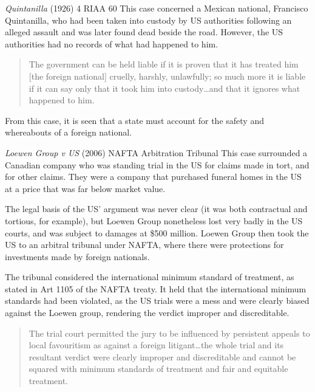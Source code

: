 \begin{casedetails}{\textit{Quintanilla} (1926) 4 RIAA 60}
    \flushleft
    This case concerned a Mexican national, Francisco Quintanilla, who had been taken into custody by US authorities following an alleged assault and was later found dead beside the road. However, the US authorities had no records of what had happened to him.

    \begin{quote}
        The government can be held liable if it is proven that it has treated him [the foreign national] cruelly, harshly, unlawfully; so much more it is liable if it can say only that it took him into custody…and that it ignores what happened to him.
    \end{quote}

    From this case, it is seen that a state must account for the safety and whereabouts of a foreign national.
\end{casedetails}

\begin{casedetails}{\textit{Loewen Group v US} (2006) NAFTA Arbitration Tribunal}
    \flushleft
    This case surrounded a Canadian company who was standing trial in the US for claims made in tort, and for other claims. They were a company that purchased funeral homes in the US at a price that was far below market value.
    
    \vspace{\baselineskip}

    The legal basis of the US' argument was never clear (it was both contractual and tortious, for example), but Loewen Group nonetheless lost very badly in the US courts, and was subject to damages at \$500 million. Loewen Group then took the US to an arbitral tribunal under NAFTA, where there were protections for investments made by foreign nationals.

    \vspace{\baselineskip}

    The tribunal considered the international minimum standard of treatment, as stated in Art 1105 of the NAFTA treaty. It held that the international minimum standards had been violated, as the US trials were a mess and were clearly biased against the Loewen group, rendering the verdict improper and discreditable.
    
    \begin{quote}
        The trial court permitted the jury to be influenced by persistent appeals to local favouritism as against a foreign litigant…the whole trial and its resultant verdict were clearly improper and discreditable and cannot be squared with minimum standards of treatment and fair and equitable treatment.
    \end{quote}
\end{casedetails}

